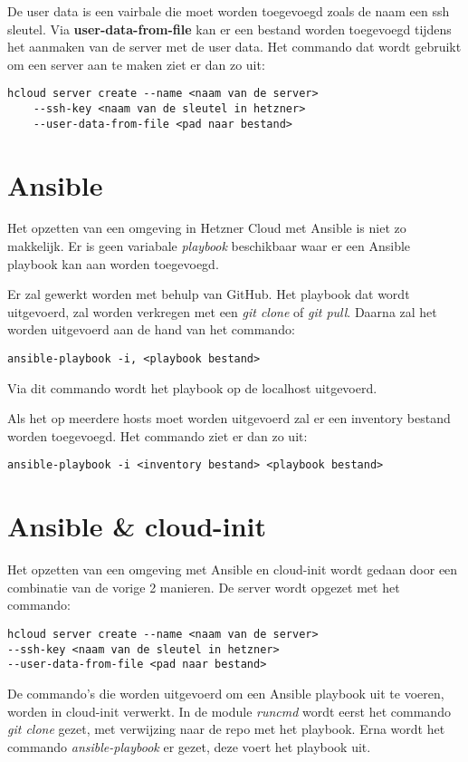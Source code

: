 De user data is een vairbale die moet worden toegevoegd zoals de naam een ssh sleutel. Via \textbf{user-data-from-file} kan er een bestand worden toegevoegd tijdens het aanmaken van de server met de user data. Het commando dat wordt gebruikt om een server aan te maken ziet er dan zo uit:
\begin{lstlisting}
hcloud server create --name <naam van de server> 
    --ssh-key <naam van de sleutel in hetzner>
    --user-data-from-file <pad naar bestand>
\end{lstlisting}

\section{Ansible}
Het opzetten van een omgeving in Hetzner Cloud met Ansible is niet zo makkelijk. Er is geen variabale \textit{playbook} beschikbaar waar er een Ansible playbook kan aan worden toegevoegd.

Er zal gewerkt worden met behulp van GitHub. Het playbook dat wordt uitgevoerd, zal worden verkregen met een \textit{git clone} of \textit{git pull}. Daarna zal het worden uitgevoerd aan de hand van het commando:
\begin{lstlisting}
ansible-playbook -i, <playbook bestand>
\end{lstlisting}
Via dit commando wordt het playbook op de localhost uitgevoerd. 

Als het op meerdere hosts moet worden uitgevoerd zal er een inventory bestand worden toegevoegd. Het commando ziet er dan zo uit:
\begin{lstlisting}
ansible-playbook -i <inventory bestand> <playbook bestand>
\end{lstlisting}

\newpage
\section{Ansible \& cloud-init}
Het opzetten van een omgeving met Ansible en cloud-init wordt gedaan door een combinatie van de vorige 2 manieren. De server wordt opgezet met het commando:
\begin{lstlisting}
hcloud server create --name <naam van de server> 
--ssh-key <naam van de sleutel in hetzner>
--user-data-from-file <pad naar bestand>
\end{lstlisting}
De commando's die worden uitgevoerd om een Ansible playbook uit te voeren, worden in cloud-init verwerkt. In de module \textit{runcmd} wordt eerst het commando \textit{git clone} gezet, met verwijzing naar de repo met het playbook. Erna wordt het commando \textit{ansible-playbook} er gezet, deze voert het playbook uit.

